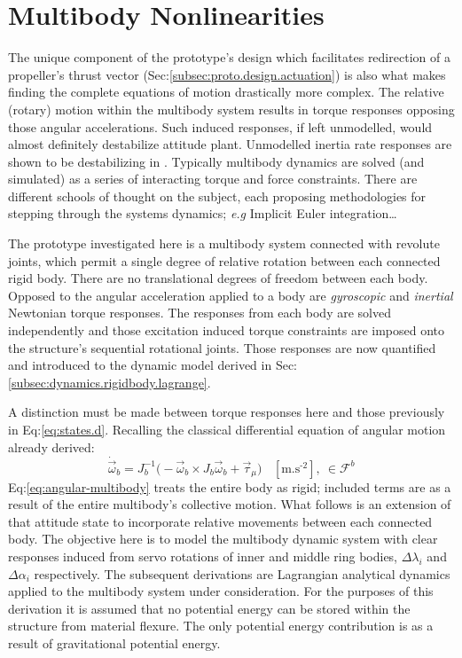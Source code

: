 \section{Multibody Nonlinearities}
\label{sec:dynamics.nonlinearities}
The unique component of the prototype's design which facilitates redirection of a propeller's thrust vector (Sec:\ref{subsec:proto.design.actuation}) is also what makes finding the complete equations of motion drastically more complex. The relative (rotary) motion within the multibody system results in torque responses opposing those angular accelerations. Such induced responses, if left unmodelled, would almost definitely destabilize attitude plant. Unmodelled inertia rate responses are shown to be destabilizing in \cite{inertiaspin}. Typically multibody dynamics are solved (and simulated) as a series of interacting torque and force constraints. There are different schools of thought on the subject, each proposing methodologies for stepping through the systems dynamics; \emph{e.g} Implicit Euler integration\cite{physicallybased,multibodydynamics}\ldots
\par
The prototype investigated here is a multibody system connected with revolute joints, which permit a single degree of relative rotation between each connected rigid body. There are no translational degrees of freedom between each body. Opposed to the angular acceleration applied to a body are \emph{gyroscopic} and \emph{inertial} Newtonian torque responses. The responses from each body are solved independently and those excitation induced torque constraints are imposed onto the structure's sequential rotational joints. Those responses are now quantified and introduced to the dynamic model derived in Sec:\ref{subsec:dynamics.rigidbody.lagrange}. 
\par
A distinction must be made between torque responses here and those previously in Eq:\ref{eq:states.d}. Recalling the classical differential equation of angular motion already derived:
\begin{equation}\label{eq:angular-multibody}
\dot{\vec{\omega}}_b=J_b^{-1}\big(-\vec{\omega}_b\times J_b\vec{\omega}_b+\vec{\tau}_\mu\big)~~~~[\text{m.s}^{\text{-}2}],~\in\mathcal{F}^b
\end{equation}
Eq:\ref{eq:angular-multibody} treats the entire body as rigid; included terms are as a result of the entire multibody's collective motion. What follows is an extension of that attitude state to incorporate relative movements between each connected body. The objective here is to model the multibody dynamic system with clear responses induced from servo rotations of inner and middle ring bodies, $\Delta\lambda_i$ and $\Delta\alpha_i$ respectively. The subsequent derivations are Lagrangian analytical dynamics applied to the multibody system under consideration. For the purposes of this derivation it is assumed that no potential energy can be stored within the structure from material flexure. The only potential energy contribution is as a result of gravitational potential energy.
